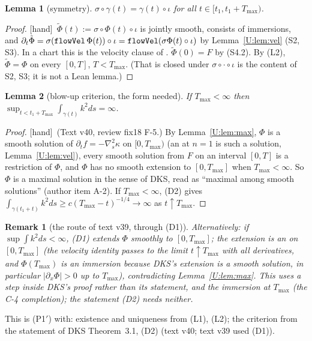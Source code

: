 \documentclass[11pt]{article}
\newtheorem{lemma}{Lemma}\newtheorem{proposition}{Proposition}\newtheorem{remark}{Remark}\newtheorem{theorem}{Theorem}\newtheorem{definition}{Definition}
\newcommand{\fn}[1]{\texttt{\detokenize{#1}}}
\newcommand{\tH}{\textup{[hand]}}\newcommand{\tS}{\textup{[sym]}}\newcommand{\tR}{\textup{[read]}}\newcommand{\tL}{\textup{[Lean]}}\newcommand{\tD}{\textup{[DKS]}}\newcommand{\tI}{\textup{[inh]}}
\begin{document}
\begin{lemma}[symmetry]\label{U:lem:sym}
$\sigma\circ\gamma(t)=\gamma(t)\circ\iota$ for all $t\in[t_1,t_1+T_{\max})$.
\end{lemma}
\begin{proof}\tH\ $\tilde\Phi(t):=\sigma\circ\Phi(t)\circ\iota$ is jointly smooth, consists of immersions, and $\partial_t\tilde\Phi=\sigma(\fn{flowVel}\,\Phi(t))\circ\iota=\fn{flowVel}(\sigma\Phi(t)\circ\iota)$ by Lemma~\ref{U:lem:vel} (S2, S3). In a chart this is the velocity clause of \fn{IsFlow}. $\tilde\Phi(0)=F$ by (S4.2). By (L2), $\tilde\Phi=\Phi$ on every $[0,T]$, $T<T_{\max}$. (That \fn{IsFlow} is closed under $\sigma\circ\cdot\circ\iota$ is the content of S2, S3; it is not a Lean lemma.)
\end{proof}

\begin{lemma}[blow-up criterion, the form needed]\label{U:lem:bu}
If $T_{\max}<\infty$ then $\sup_{t<t_1+T_{\max}}\int_{\gamma(t)}k^2ds=\infty$.
\end{lemma}
\begin{proof}\tH\ (Text v40, review fix18 F-5.) By Lemma~\ref{U:lem:max}, $\Phi$ is a smooth solution of $\partial_tf=-\nabla_s^2\kappa$ on $[0,T_{\max})$ (an \fn{IsFlow} at $n=1$ is such a solution, Lemma~\ref{U:lem:vel}), every smooth solution from $F$ on an interval $[0,T]$ is a restriction of $\Phi$, and $\Phi$ has no smooth extension to $[0,T_{\max}]$ when $T_{\max}<\infty$. So $\Phi$ is a maximal solution in the sense of DKS, read as ``maximal among smooth solutions'' (author item A-2). If $T_{\max}<\infty$, (D2) gives $\int_{\gamma(t_1+t)}k^2ds\ge c(T_{\max}-t)^{-1/4}\to\infty$ as $t\uparrow T_{\max}$.
\end{proof}
\begin{remark}[the route of text v39, through (D1)]\label{U:rem:D1}
Alternatively: if $\sup\int k^2ds<\infty$, (D1) extends $\Phi$ smoothly to $[0,T_{\max}]$; the extension is an \fn{IsFlow} on $[0,T_{\max}]$ (the velocity identity passes to the limit $t\uparrow T_{\max}$ with all derivatives, and $\Phi(T_{\max})$ is an immersion because DKS's extension is a smooth solution, in particular $|\partial_x\Phi|>0$ up to $T_{\max}$), contradicting Lemma~\ref{U:lem:max}. This uses a step inside DKS's proof rather than its statement, and the immersion at $T_{\max}$ (the C-4 completion); the statement (D2) needs neither.
\end{remark}
\noindent This is (P1$'$) with: existence and uniqueness from (L1), (L2); the criterion from the statement of DKS Theorem~3.1, (D2) (text v40; text v39 used (D1)).
\end{document}
